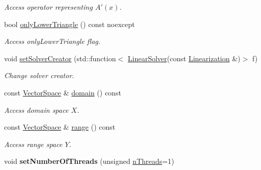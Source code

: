 \begin{DoxyCompactItemize}
\begin{DoxyCompactList}\small\item\em Access operator representing $A'(x)$. \end{DoxyCompactList}\item 
bool \hyperlink{classSpacy_1_1Kaskade_1_1C1Operator_adb85b50e1cc87fb342412560353c2f73}{only\+Lower\+Triangle} () const noexcept
\begin{DoxyCompactList}\small\item\em Access only\+Lower\+Triangle flag. \end{DoxyCompactList}\item 
void \hyperlink{classSpacy_1_1Kaskade_1_1C1Operator_aa0c69955542db6b0f61807181874b4d9}{set\+Solver\+Creator} (std\+::function$<$ \hyperlink{namespaceSpacy_a4cd614ddb41dd29e68a723dadd5602f2}{Linear\+Solver}(const \hyperlink{classSpacy_1_1Kaskade_1_1LinearOperator}{Linearization} \&)$>$ f)
\begin{DoxyCompactList}\small\item\em Change solver creator. \end{DoxyCompactList}\item 
\hypertarget{classSpacy_1_1OperatorBase_a2588f9b3e0188820c4c494e63293dc6f}{}const \hyperlink{classSpacy_1_1VectorSpace}{Vector\+Space} \& \hyperlink{classSpacy_1_1OperatorBase_a2588f9b3e0188820c4c494e63293dc6f}{domain} () const \label{classSpacy_1_1OperatorBase_a2588f9b3e0188820c4c494e63293dc6f}

\begin{DoxyCompactList}\small\item\em Access domain space $X$. \end{DoxyCompactList}\item 
\hypertarget{classSpacy_1_1OperatorBase_ab19d3b7a6f290b1079248f1e567e53d6}{}const \hyperlink{classSpacy_1_1VectorSpace}{Vector\+Space} \& \hyperlink{classSpacy_1_1OperatorBase_ab19d3b7a6f290b1079248f1e567e53d6}{range} () const \label{classSpacy_1_1OperatorBase_ab19d3b7a6f290b1079248f1e567e53d6}

\begin{DoxyCompactList}\small\item\em Access range space $Y$. \end{DoxyCompactList}\item 
\hypertarget{classSpacy_1_1Mixin_1_1NumberOfThreads_ab0c2fca77cb0d613e3bb8ce5bda11fdc}{}void {\bfseries set\+Number\+Of\+Threads} (unsigned \hyperlink{classSpacy_1_1Mixin_1_1NumberOfThreads_a385963b95b5e1ddf422393146cc71ee1}{n\+Threads}=1)\label{classSpacy_1_1Mixin_1_1NumberOfThreads_ab0c2fca77cb0d613e3bb8ce5bda11fdc}


\end{DoxyCompactItemize}
